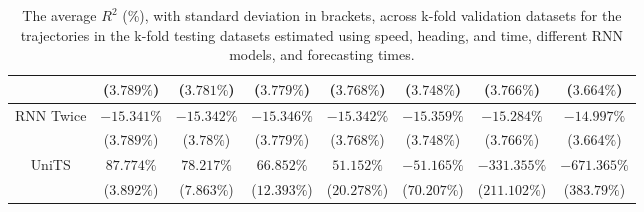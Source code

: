 \begin{table}[!ht]
{\begin{tabular}{|c|c|c|c|c|c|c|c|}
			 & ($3.789\%$) & ($3.781\%$) & ($3.779\%$) & ($3.768\%$) & ($3.748\%$) & ($3.766\%$) & ($3.664\%$) \\ \hline
			\multirow{2}{*}{RNN Twice} & $-15.341\%$ & $-15.342\%$ & $-15.346\%$ & $-15.342\%$ & $-15.359\%$ & $-15.284\%$ & $-14.997\%$ \\
			 & ($3.789\%$) & ($3.78\%$) & ($3.779\%$) & ($3.768\%$) & ($3.748\%$) & ($3.766\%$) & ($3.664\%$) \\ \hline
			\multirow{2}{*}{UniTS} & $87.774\%$ & $78.217\%$ & $66.852\%$ & $51.152\%$ & $-51.165\%$ & $-331.355\%$ & $-671.365\%$ \\
			 & ($3.892\%$) & ($7.863\%$) & ($12.393\%$) & ($20.278\%$) & ($70.207\%$) & ($211.102\%$) & ($383.79\%$) \\ \hline
		\end{tabular}
	}
	\caption{The average $R^{2}$ (\%), with standard deviation in brackets, across k-fold validation datasets for the trajectories in the k-fold testing datasets estimated using speed, heading, and time, different RNN models, and forecasting times.}
	\label{tab:all_speed_actual_dir_R2}
\end{table}